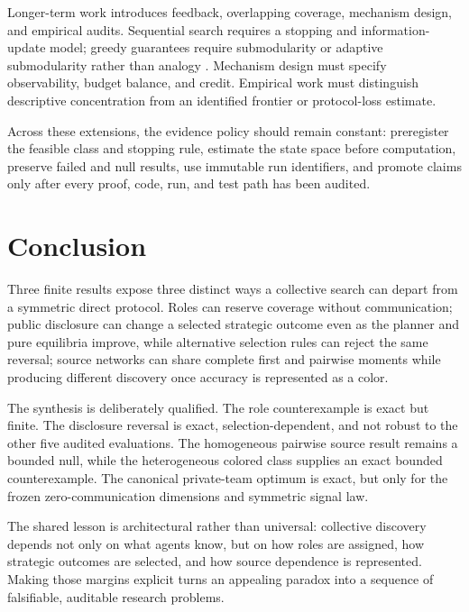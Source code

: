\documentclass[11pt]{article}
\theoremstyle{remark}
\begin{document}
Longer-term work introduces feedback, overlapping coverage, mechanism design, and
empirical audits. Sequential search requires a stopping and information-update
model; greedy guarantees require submodularity or adaptive submodularity rather
than analogy \citep{NemhauserEtAl1978,GolovinKrause2011}. Mechanism design must
specify observability, budget balance, and credit. Empirical work must distinguish
descriptive concentration from an identified frontier or protocol-loss estimate.

Across these extensions, the evidence policy should remain constant: preregister
the feasible class and stopping rule, estimate the state space before computation,
preserve failed and null results, use immutable run identifiers, and promote
claims only after every proof, code, run, and test path has been audited.

\section{Conclusion}
Three finite results expose three distinct ways a collective search can depart
from a symmetric direct protocol. Roles can reserve coverage without
communication; public disclosure can change a selected strategic outcome even as
the planner and pure equilibria improve, while alternative selection rules can
reject the same reversal; source networks can share complete first and pairwise
moments while producing different discovery once accuracy is represented as a
color.

The synthesis is deliberately qualified. The role counterexample is exact but
finite. The disclosure reversal is exact, selection-dependent, and not robust to
the other five audited evaluations. The homogeneous pairwise source result remains
a bounded null, while the heterogeneous colored class supplies an exact bounded
counterexample. The canonical private-team optimum is exact, but only for the
frozen zero-communication dimensions and symmetric signal law.

The shared lesson is architectural rather than universal: collective discovery
depends not only on what agents know, but on how roles are assigned, how strategic
outcomes are selected, and how source dependence is represented. Making those
margins explicit turns an appealing paradox into a sequence of falsifiable,
auditable research problems.


{\raggedright\par}
\end{document}
